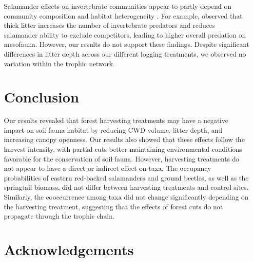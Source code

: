 Salamander effects on invertebrate communities appear to partly depend on community composition and habitat heterogeneity \citep{MichaelWalton2005Salamandersforestfloor,Walton2006Salamandersforestfloor,Walton2013Topdownregulation,Best2014trophicrole}. 
For example, \cite{Walton2013Topdownregulation} observed that thick litter increases the number of invertebrate predators and reduces salamander ability to exclude competitors, leading to higher overall predation on mesofauna. 
However, our results do not support these findings. 
Despite significant differences in litter depth across our different logging treatments, we observed no variation within the trophic network.


\section*{Conclusion}
\label{sec:conclu1}

Our results revealed that forest harvesting treatments may have a negative impact on soil fauna habitat by reducing CWD volume, litter depth, and increasing canopy openness. 
Our results also showed that these effects follow the harvest intensity, with partial cuts better maintaining environmental conditions favorable for the conservation of soil fauna. 
However, harvesting treatments do not appear to have a direct or indirect effect on taxa. 
The occupancy probabilities of eastern red-backed salamanders and ground beetles, as well as the springtail biomass, did not differ between harvesting treatments and control sites. 
Similarly, the cooccurrence among taxa did not change significantly depending on the harvesting treatment, suggesting that the effects of forest cuts do not propagate through the trophic chain. 

\section*{Acknowledgements}
\label{sec:acknowl1}

